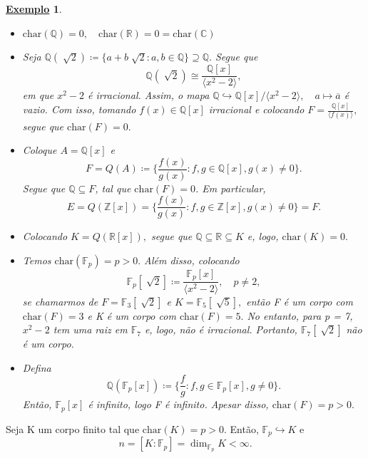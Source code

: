 \documentclass{article}
\newtheorem{example}{\underline{Exemplo}}
\begin{document}
\begin{example}
  \begin{itemize}
    \item[1)] \(\mathrm{char}(\mathbb{Q}) = 0,\quad \mathrm{char}(\mathbb{R})=0 = \mathrm{char}(\mathbb{C})\)
    \item[2)] Seja \(\mathbb{Q}(\sqrt[]{2})\coloneqq \{a + b\sqrt[]{2}: a, b\in \mathbb{Q}\}\supseteq{\mathbb{Q}}.\) Segue que 
      \[
        \mathbb{Q}(\sqrt[]{2})\cong{\frac{\mathbb{Q}[x]}{\langle x^{2}-2 \rangle}},
      \]
      em que \(x^{2}-2\) é irracional. Assim, o mapa \(\mathbb{Q}\hookrightarrow \mathbb{Q}[x]/\langle x^{2}-2 \rangle,\quad a\mapsto \overline{a}\) é vazio.
      Com isso, tomando \(f(x)\in \mathbb{Q}[x]\) irracional e colocando \(F = \frac{\mathbb{Q}[x]}{\langle f(x) \rangle},\)
      segue que \(\mathrm{char}(F) = 0.\)
    \item[3)] Coloque \(A = \mathbb{Q}[x]\) e
      \[
        F = Q(A)\coloneqq \biggl\{\frac{f(x)}{g(x)}: f, g\in \mathbb{Q}[x], g(x)\neq0\biggr\}.
      \]
      Segue que \(\mathbb{Q}\subseteq{F}\), tal que \(\mathrm{char}(F) = 0\). Em particular, 
      \[
        E = Q(\mathbb{Z}[x]) = \biggl\{\frac{f(x)}{g(x)}:f, g\in \mathbb{Z}[x], g(x)\neq0\biggr\} = F.
      \]
    \item[4)] Colocando \(K = Q(\mathbb{R}[x]),\) segue que \(\mathbb{Q} \subseteq{\mathbb{R}}\subseteq{K}\) e, logo, \(\mathrm{char}(K) = 0.\)
    \item[5)] Temos \(\mathrm{char}(\mathbb{F}_{p}) = p > 0.\) Além disso, colocando 
      \[
        \mathbb{F}_{p}[\sqrt[]{2}]\coloneqq \frac{\mathbb{F}_{p}[x]}{\langle x^{2}-2 \rangle},\quad p\neq2,
      \]
      se chamarmos de \(F = \mathbb{F}_{3}[\sqrt[]{2}]\) e \(K = \mathbb{F}_{5}[\sqrt[]{5}],\) então
      F é um corpo com \(\mathrm{char}(F) = 3\) e K é um corpo com \(\mathrm{char}(F) = 5.\) No entanto, para p = 7,
      \(x^{2}-2\) tem uma raiz em \(\mathbb{F}_{7}\) e, logo, não é irracional. Portanto, \(\mathbb{F}_{7}[\sqrt[]{2}]\) não é um
      corpo.
    \item[6)] Defina 
      \[
        \mathbb{Q}(\mathbb{F}_{p}[x])\coloneqq \biggl\{\frac{f}{g}: f, g\in \mathbb{F}_{p}[x], g\neq 0\biggr\}.
      \]
      Então, \(\mathbb{F}_{p}[x]\) é infinito, logo F é infinito. Apesar disso, \(\mathrm{char}(F) = p > 0.\)
  \end{itemize}
\end{example}
Seja K um corpo finito tal que \(\mathrm{char}(K) = p > 0.\) Então, \(\mathbb{F}_{p}\hookrightarrow K\) e 
\[
  n = [K:\mathbb{F}_{p}] = \dim_{\mathbb{F}_{p}}K < \infty.
\]
\end{document}
